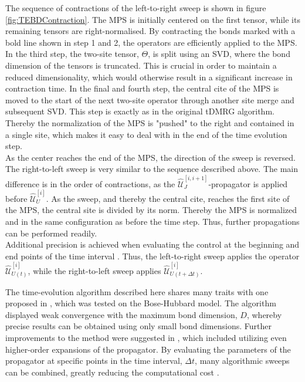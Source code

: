 The sequence of contractions of the left-to-right sweep is shown in figure \ref{fig:TEBDContraction}. The MPS is initially centered on the first tensor, while its remaining tensors are right-normalised. By contracting the bonds marked with a bold line shown in step 1 and 2, the operators are efficiently applied to the MPS. In the third step, the two-site tensor, $\Theta$, is split using an SVD, where the bond dimension of the tensors is truncated. This is crucial in order to maintain a reduced dimensionality, which would otherwise result in a significant increase in contraction time. In the final and fourth step, the central cite of the MPS is moved to the start of the next two-site operator through another site merge and subsequent SVD. This step is exactly as in the original tDMRG algorithm. Thereby the normalization of the MPS is "pushed" to the right and contained in a single site, which makes it easy to deal with in the end of the time evolution step.\\
As the center reaches the end of the MPS, the direction of the sweep is reversed. The right-to-left sweep is very similar to the sequence described above. The main difference is in the order of contractions, as the $\hat{\mathcal{U}}_{J}^{[i,i+1]}$-propagator is applied before $\hat{\mathcal{U}}_{U}^{[i]}$. As the sweep, and thereby the central cite, reaches the first site of the MPS, the central site is divided by its norm. Thereby the MPS is normalized and in the same configuration as before the time step. Thus, further propagations can be performed readily.\\ 
Additional precision is achieved when evaluating the control at the beginning and end points of the time interval \cite{Steck2007}. Thus, the left-to-right sweep applies the operator $\hat{\mathcal{U}}_{U(t)}^{[i]} $, while the right-to-left sweep applies $\hat{\mathcal{U}}_{U(t + \Delta t)}^{[i]}$.

The time-evolution algorithm described here shares many traits with one proposed in \cite{Daley2004}, which was tested on the Bose-Hubbard model. The algorithm displayed weak convergence with the maximum bond dimension, $D$, whereby precise results can be obtained using only small bond dimensions. Further improvements to the method were suggested in \cite{Daley2004}, which included utilizing even higher-order expansions of the propagator. By evaluating the parameters of the propagator at specific points in the time interval, $\Delta t$, many algorithmic sweeps can be combined, greatly reducing the computational cost \cite{Yoshida1990,Krech1998}.



